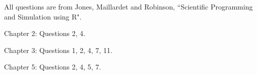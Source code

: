\documentclass[11pt]{exam}
\begin{document}
\begin{center} 
\end{center} 

\lstset{language=Python,numbers=left}

\vspace{0.1in} 

All questions are from Jones, Maillardet and Robinson, ``Scientific Programming and Simulation using R".

\begin{questions}
	
\question[7] Chapter 2: Questions 2, 4. 

\question[12] Chapter 3: Questions 1, 2, 4, 7, 11.

\question[11] Chapter 5: Questions 2, 4, 5, 7.

\end{questions}
\end{document}
